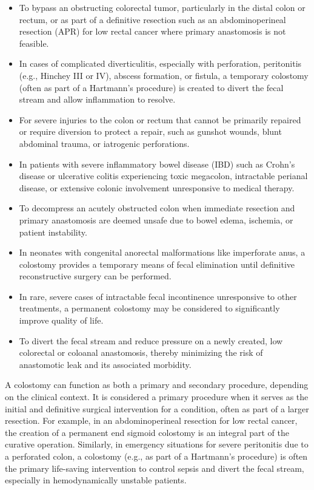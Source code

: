 \begin{itemize}
  \item To bypass an obstructing colorectal tumor, particularly in the distal colon or rectum, or as part of a definitive resection such as an abdominoperineal resection (APR) for low rectal cancer where primary anastomosis is not feasible.
  \item In cases of complicated diverticulitis, especially with perforation, peritonitis (e.g., Hinchey III or IV), abscess formation, or fistula, a temporary colostomy (often as part of a Hartmann's procedure) is created to divert the fecal stream and allow inflammation to resolve.
  \item For severe injuries to the colon or rectum that cannot be primarily repaired or require diversion to protect a repair, such as gunshot wounds, blunt abdominal trauma, or iatrogenic perforations.
  \item In patients with severe inflammatory bowel disease (IBD) such as Crohn's disease or ulcerative colitis experiencing toxic megacolon, intractable perianal disease, or extensive colonic involvement unresponsive to medical therapy.
  \item To decompress an acutely obstructed colon when immediate resection and primary anastomosis are deemed unsafe due to bowel edema, ischemia, or patient instability.
  \item In neonates with congenital anorectal malformations like imperforate anus, a colostomy provides a temporary means of fecal elimination until definitive reconstructive surgery can be performed.
  \item In rare, severe cases of intractable fecal incontinence unresponsive to other treatments, a permanent colostomy may be considered to significantly improve quality of life.
  \item To divert the fecal stream and reduce pressure on a newly created, low colorectal or coloanal anastomosis, thereby minimizing the risk of anastomotic leak and its associated morbidity.
\end{itemize}

A colostomy can function as both a primary and secondary procedure, depending on the clinical context. It is considered a primary procedure when it serves as the initial and definitive surgical intervention for a condition, often as part of a larger resection. For example, in an abdominoperineal resection for low rectal cancer, the creation of a permanent end sigmoid colostomy is an integral part of the curative operation. Similarly, in emergency situations for severe peritonitis due to a perforated colon, a colostomy (e.g., as part of a Hartmann's procedure) is often the primary life-saving intervention to control sepsis and divert the fecal stream, especially in hemodynamically unstable patients.

